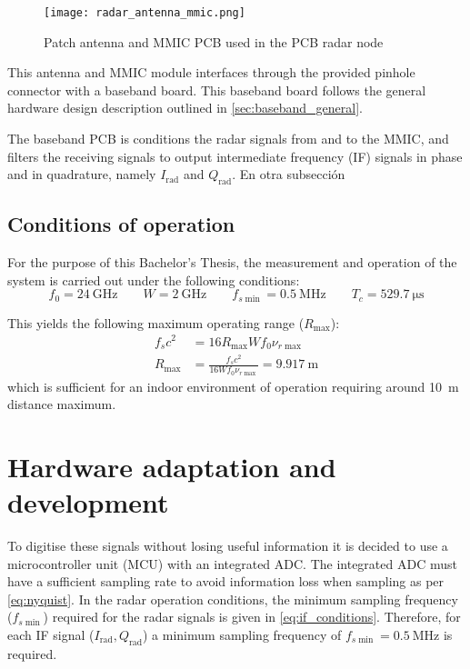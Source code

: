 \begin{figure}[ht]
	\centering
	\texttt{[image: radar\_antenna\_mmic.png]}
	\caption{Patch antenna and MMIC PCB used in the PCB radar node \label{fig:mmic}}
\end{figure}

This antenna and MMIC module interfaces through the provided pinhole connector with a baseband board. This baseband board follows the general hardware design description outlined in \cref{sec:baseband_general}.

The baseband PCB is conditions the radar signals from and to the MMIC, and filters the receiving signals to output intermediate frequency (IF) signals in phase and in quadrature, namely $I_{\mathrm{rad}}$ and $Q_{\mathrm{rad}}$.
En otra subsección

\subsection{Conditions of operation}
For the purpose of this Bachelor's Thesis, the measurement and operation of the system is carried out under the following conditions:
\begin{equation} \label{eq:if_conditions}
	f_0 = \SI{24}{\giga\hertz} \qquad W = \SI{2}{\giga\hertz} \qquad f_{s\min} = \SI{0.5}{\mega\hertz} \qquad T_c = \SI{529.7}{\micro\second}
\end{equation}

This yields the following maximum operating range ($R_{\max}$):
\begin{align}
	f_s c^2 &= 16 R_{\max}W f_0 \nu_{r\max} \\
	R_{\max} &= \frac{f_s c^2}{16 W f_0 \nu_{r\max}} = \SI{9.917}{\meter}
\end{align}
which is sufficient for an indoor environment of operation requiring around \SI{10}{\meter} distance maximum.

\section{Hardware adaptation and development}
To digitise these signals without losing useful information it is decided to use a microcontroller unit (MCU) with an integrated ADC. The integrated ADC must have a sufficient sampling rate to avoid information loss when sampling as per \cref{eq:nyquist}. In the radar operation conditions, the minimum sampling frequency ($f_{s\min}$) required for the radar signals is given in \cref{eq:if_conditions}. Therefore, for each IF signal ($I_\mathrm{rad}, Q_\mathrm{rad}$) a minimum sampling frequency of $f_{s\min} = \SI{0.5}{\mega\hertz}$ is required.

